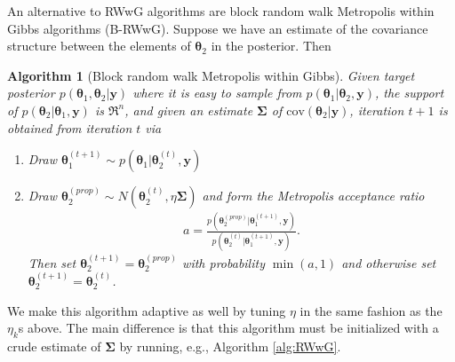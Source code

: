 \documentclass[12pt]{article}
\newtheorem{alg}{Algorithm}
\begin{document}
An alternative to RWwG algorithms are block random walk Metropolis within Gibbs algorithms (B-RWwG). Suppose we have an estimate of the covariance structure between the elements of $\bm{\theta}_2$ in the posterior. Then 
\begin{alg}[Block random walk Metropolis within Gibbs]\label{alg:B-RWwG}
Given target posterior $p(\bm{\theta}_1,\bm{\theta}_2|\bm{y})$ where it is easy to sample from $p(\bm{\theta}_1|\bm{\theta}_2,\bm{y})$, the support of $p(\bm{\theta}_{2}|\bm{\theta}_1,\bm{y})$ is $\Re^n$, and given an estimate $\bm{\Sigma}$ of $\mathrm{cov}(\bm{\theta}_2|\bm{y})$, iteration $t+1$ is obtained from iteration $t$ via
\begin{enumerate}
\item Draw $\bm{\theta}_1^{(t+1)} \sim p(\bm{\theta}_1|\bm{\theta}_2^{(t)},\bm{y})$
\item Draw $\bm{\theta}_{2}^{(prop)} \sim N(\bm{\theta}_{2}^{(t)}, \eta\bm{\Sigma})$ and form the Metropolis acceptance ratio
\begin{align*}
a = \frac{p(\bm{\theta}_{2}^{(prop)}|\bm{\theta}_1^{(t+1)},\bm{y})}{p(\bm{\theta}_{2}^{(t)}|\bm{\theta}_1^{(t+1)},\bm{y})}.
\end{align*}
Then set $\bm{\theta}_{2}^{(t+1)}=\bm{\theta}_{2}^{(prop)}$ with probability $\min(a,1)$ and otherwise set $\bm{\theta}_{2}^{(t+1)} = \bm{\theta}_{2}^{(t)}$.
\end{enumerate}
\end{alg}
We make this algorithm adaptive as well by tuning $\eta$ in the same fashion as the $\eta_k$s above. The main difference is that this algorithm must be initialized with a crude estimate of $\bm{\Sigma}$ by running, e.g., Algorithm \ref{alg:RWwG}.

\clearpage\pagebreak\newpage\thispagestyle{empty}


\end{document}
